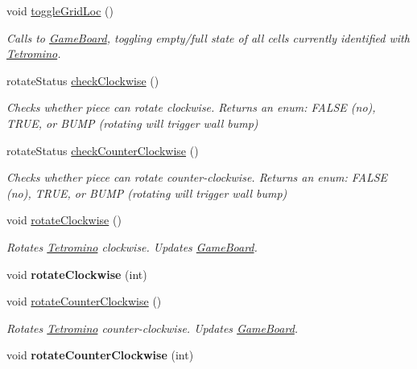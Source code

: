 \begin{DoxyCompactItemize}
\item 
\hypertarget{class_tetromino_a85b11b683ac5d714b613f540684a262a}{void \hyperlink{class_tetromino_a85b11b683ac5d714b613f540684a262a}{toggle\-Grid\-Loc} ()}\label{class_tetromino_a85b11b683ac5d714b613f540684a262a}

\begin{DoxyCompactList}\small\item\em Calls to \hyperlink{class_game_board}{Game\-Board}, toggling empty/full state of all cells currently identified with \hyperlink{class_tetromino}{Tetromino}. \end{DoxyCompactList}\item 
\hypertarget{class_tetromino_a1d4927d722d5de5a8aac1de8d8a0e713}{rotate\-Status \hyperlink{class_tetromino_a1d4927d722d5de5a8aac1de8d8a0e713}{check\-Clockwise} ()}\label{class_tetromino_a1d4927d722d5de5a8aac1de8d8a0e713}

\begin{DoxyCompactList}\small\item\em Checks whether piece can rotate clockwise. Returns an enum\-: F\-A\-L\-S\-E (no), T\-R\-U\-E, or B\-U\-M\-P (rotating will trigger wall bump) \end{DoxyCompactList}\item 
\hypertarget{class_tetromino_a9b64a4a62805b540378e222743aa6184}{rotate\-Status \hyperlink{class_tetromino_a9b64a4a62805b540378e222743aa6184}{check\-Counter\-Clockwise} ()}\label{class_tetromino_a9b64a4a62805b540378e222743aa6184}

\begin{DoxyCompactList}\small\item\em Checks whether piece can rotate counter-\/clockwise. Returns an enum\-: F\-A\-L\-S\-E (no), T\-R\-U\-E, or B\-U\-M\-P (rotating will trigger wall bump) \end{DoxyCompactList}\item 
void \hyperlink{class_tetromino_aa078c0b669a8b79dc79af86e47eb05ff}{rotate\-Clockwise} ()
\begin{DoxyCompactList}\small\item\em Rotates \hyperlink{class_tetromino}{Tetromino} clockwise. Updates \hyperlink{class_game_board}{Game\-Board}. \end{DoxyCompactList}\item 
\hypertarget{class_tetromino_a09ee6f49c44090dfd3004b484d213741}{void {\bfseries rotate\-Clockwise} (int)}\label{class_tetromino_a09ee6f49c44090dfd3004b484d213741}

\item 
void \hyperlink{class_tetromino_a2378c790ae933d66346b2a3c6658d506}{rotate\-Counter\-Clockwise} ()
\begin{DoxyCompactList}\small\item\em Rotates \hyperlink{class_tetromino}{Tetromino} counter-\/clockwise. Updates \hyperlink{class_game_board}{Game\-Board}. \end{DoxyCompactList}\item 
\hypertarget{class_tetromino_a0b7d7cab0aa875d99f4bf0f65eb05ac8}{void {\bfseries rotate\-Counter\-Clockwise} (int)}\label{class_tetromino_a0b7d7cab0aa875d99f4bf0f65eb05ac8}


\end{DoxyCompactItemize}
